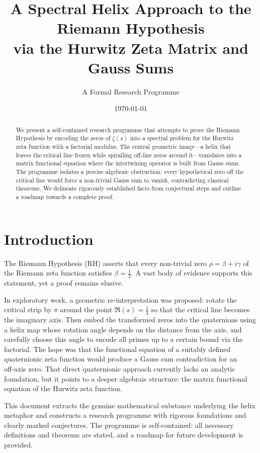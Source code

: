 \documentclass{article}
\title{A Spectral Helix Approach to the Riemann Hypothesis\\
 via the Hurwitz Zeta Matrix and Gauss Sums}
\author{A Formal Research Programme}
\date{\today}
\theoremstyle{definition}
\begin{document}
\maketitle

\begin{abstract}
We present a self‑contained research programme that attempts to prove the Riemann Hypothesis by encoding the zeros of \(\zeta(s)\) into a spectral problem for the Hurwitz zeta function with a factorial modulus. The central geometric image—a helix that leaves the critical line frozen while spiralling off‑line zeros around it—translates into a matrix functional equation where the intertwining operator is built from Gauss sums. The programme isolates a precise algebraic obstruction: every hypothetical zero off the critical line would force a non‑trivial Gauss sum to vanish, contradicting classical theorems. We delineate rigorously established facts from conjectural steps and outline a roadmap towards a complete proof.
\end{abstract}

\section{Introduction}

The Riemann Hypothesis (RH) asserts that every non‑trivial zero \(\rho = \beta + i\gamma\) of the Riemann zeta function satisfies \(\beta = \tfrac12\). A vast body of evidence supports this statement, yet a proof remains elusive. 

In exploratory work, a geometric re‑interpretation was proposed: rotate the critical strip by \(\pi\) around the point \(\Re(s)=\tfrac14\) so that the critical line becomes the imaginary axis. Then embed the transformed zeros into the quaternions using a helix map whose rotation angle depends on the distance from the axis, and carefully choose this angle to encode all primes up to a certain bound via the factorial. The hope was that the functional equation of a suitably defined quaternionic zeta function would produce a Gauss sum contradiction for an off‑axis zero. That direct quaternionic approach currently lacks an analytic foundation, but it points to a deeper algebraic structure: the matrix functional equation of the Hurwitz zeta function.

This document extracts the genuine mathematical substance underlying the helix metaphor and constructs a research programme with rigorous foundations and clearly marked conjectures. The programme is self‑contained: all necessary definitions and theorems are stated, and a roadmap for future development is provided.
\end{document}
